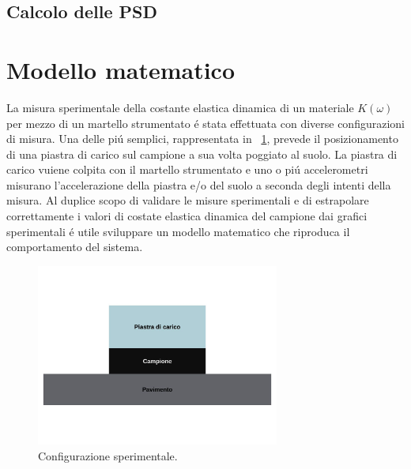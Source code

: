 \documentclass[12pt,a4paper]{article}
\begin{document}
\subsection{Calcolo delle PSD}
 

 	
 \section{Modello matematico}
	La misura sperimentale della costante elastica dinamica di un materiale $K(\omega)$ per mezzo di un martello strumentato \'e stata effettuata con diverse configurazioni di misura. Una delle pi\'u semplici, rappresentata in \figurename~\ref{fig:Phisical-configuration}, prevede il posizionamento di una piastra di carico sul campione a sua volta poggiato al suolo. La piastra di carico vuiene colpita con il martello strumentato e uno o pi\'u accelerometri misurano l'accelerazione della piastra e/o del suolo a seconda degli intenti della misura.
	Al duplice scopo di validare le misure sperimentali e di estrapolare correttamente i valori di costate elastica dinamica del campione dai grafici sperimentali \'e utile sviluppare un modello matematico che riproduca il comportamento del sistema.
	
	\begin{figure}
		\centering
		\includegraphics[width=8cm]{Phisical-system.jpg}
		\caption{Configurazione sperimentale.}
		\label{fig:Phisical-configuration}
	\end{figure}
 	
\end{document}
